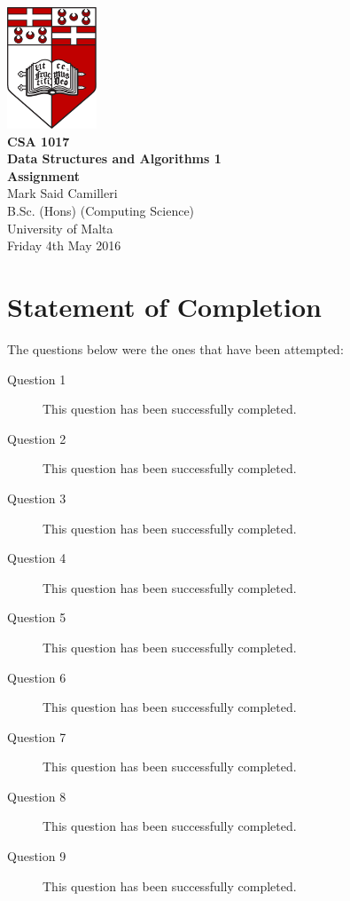 \documentclass[12pt,a4paper,onesided]{report}
\begin{document}
\begin{titlepage}
\vspace*{\fill}
\centering
\includegraphics[width=0.2\textwidth]{University_of_Malta_Logo}\\
\vspace*{3em}
\textbf{\LARGE CSA 1017\\\vspace{0.1em}Data Structures and Algorithms 1}\\
\vspace*{0.75em}
\textbf{\Large Assignment}\\
\vspace{3em}
\large Mark Said Camilleri\\
B.Sc. (Hons) (Computing Science)\\
University of Malta\\
\vspace*{1em}
Friday 4th May 2016
\vfill
\end{titlepage}
\pagebreak
\tableofcontents
{}

\chapter*{Statement of Completion}
The questions below were the ones that have been attempted:
	\begin{description}
		\item[Question 1]This question has been successfully completed.
		\item[Question 2]This question has been successfully completed.
		\item[Question 3]This question has been successfully completed.
		\item[Question 4]This question has been successfully completed.
		\item[Question 5]This question has been successfully completed.
		\item[Question 6]This question has been successfully completed.
		\item[Question 7]This question has been successfully completed.
		\item[Question 8]This question has been successfully completed.
		\item[Question 9]This question has been successfully completed.
	\end{description}
\end{document}
